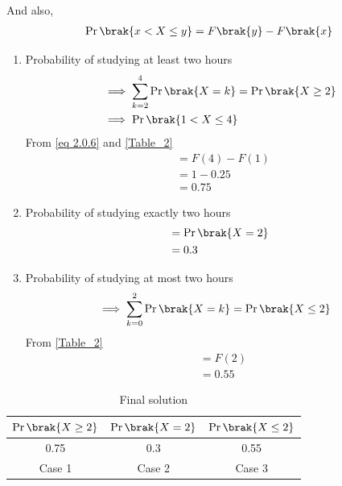 And also, 
\begin{align}
     \Pr\brak{x < X \le y} = F\brak{y} - F\brak{x} \label{eq 2.0.6}
\end{align}
         \begin{enumerate}
        \item Probability of studying at least two hours 
           \begin{align}
            & \implies \sum_{k = 2}^4 \Pr\brak{X = k} = \Pr\brak{X \ge 2}\\
            & \implies \Pr\brak{1 < X \le 4} 
        \end{align}
        From \eqref{eq 2.0.6} and \eqref{Table_2}
        \begin{align}
            & = F(4) - F(1)\\
            & = 1 - 0.25\\
            & = 0.75
        \end{align}
        
        \item Probability of studying exactly two hours
        \begin{align}
            & = \Pr\brak{X = 2}\\
            & = 0.3
        \end{align}
        
        \item Probability of studying at most two hours 
        \begin{align}
          & \implies \sum_{k = 0}^2  \Pr\brak{X = k} = \Pr \brak{X \le 2}
         \end{align}
        From \eqref{Table_2}
        \begin{align}
            & = F(2)\\
            & = 0.55
        \end{align}
    \end{enumerate}
  
    \begin{table}[ht]
   
    \centering
  \begin{tabular}{|c|c|c|}
    \hline
    $\Pr\brak{X \geq 2}$ &  $\Pr \brak{X = 2}$ & $\Pr\brak{X \leq 2}$\\
    \hline
     0.75& 0.3& 0.55 \\
    \hline
    Case 1 &Case 2 &Case 3\\
    \hline
\end{tabular} 
 \caption{Final solution}
 \label{Table_3}
\end{table}


